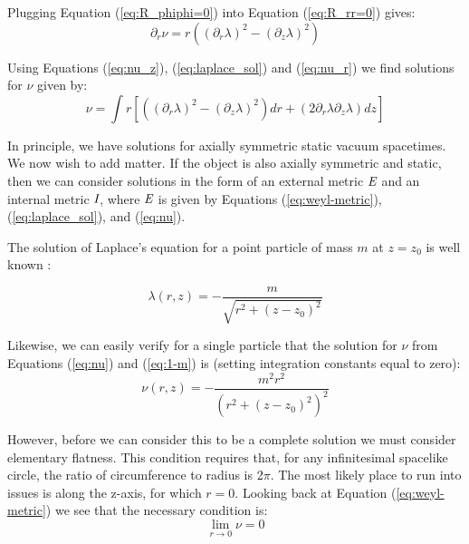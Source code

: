 \documentclass{article}
\begin{document}
Plugging Equation (\ref{eq:R_phiphi=0}) into Equation (\ref{eq:R_rr=0}) gives:
\begin{equation}
\partial_{r}\nu=r\left(\left(\partial_{r}\lambda\right)^{2}-\left(\partial_{z}\lambda\right)^{2}\right)\label{eq:nu_r}
\end{equation}

Using Equations (\ref{eq:nu_z}), (\ref{eq:laplace_sol}) and (\ref{eq:nu_r}) we find solutions for $\nu$ given by:
\begin{equation}
\nu=\int r[\left(\left(\partial_{r}\lambda\right)^{2}-\left(\partial_{z}\lambda\right)^{2}\right)dr+\left(2\partial_{r}\lambda\partial_{z}\lambda\right)dz]\label{eq:nu}
\end{equation}


In principle, we have solutions for axially symmetric static vacuum spacetimes. We now wish to add matter. If the object is also axially symmetric and static, then we can consider solutions in the form of an external metric $\emph{E}$ and an internal metric $\emph{I}$, where $\emph{E}$ is given by Equations (\ref{eq:weyl-metric}), (\ref{eq:laplace_sol}), and (\ref{eq:nu}).

The solution of Laplace's equation for a point particle of mass $m$ at $z=z_{0}$ is well known \cite{letelier1997superposition}:

\begin{equation}
\lambda (r,z)=-\frac{m}{\sqrt{r^{2}+\left(z-z_{0}\right)^{2}}}\label{eq:1-m}
\end{equation}

Likewise, we can easily verify for a single particle that the solution for $\nu$ from Equations (\ref{eq:nu}) and (\ref{eq:1-m}) is (setting integration constants equal to zero):
\begin{equation}
\nu (r,z)=-\frac{m^{2}r^{2}}{\left(r^{2}+\left(z-z_{0}\right)^{2}\right)^{2}}
\end{equation}

However, before we can consider this to be a complete solution we must consider elementary flatness. This condition requires that, for any infinitesimal spacelike circle, the ratio of circumference to radius is 2$\pi$. The most likely place to run into issues is along the z-axis, for which $r=0$. Looking back at Equation (\ref{eq:weyl-metric}) we see that the necessary condition is:
\begin{equation}
\lim_{r\rightarrow 0}\nu=0\label{eq:elem-flat}
\end{equation}
\end{document}
